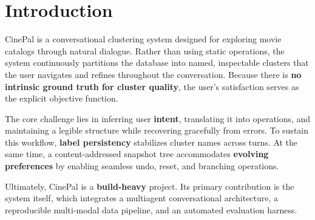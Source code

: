 \section{Introduction}\label{sec:introduction}

CinePal is a conversational clustering system designed for exploring movie catalogs through natural dialogue.
Rather than using static operations, the system continuously partitions the database into named, inspectable clusters that the user navigates and refines throughout the conversation.
Because there is \textbf{no intrinsic ground truth for cluster quality}, the user's satisfaction serves as the explicit objective function.

The core challenge lies in inferring user \textbf{intent}, translating it into operations, and maintaining a legible structure while recovering gracefully from errors.
To sustain this workflow, \textbf{label persistency} stabilizes cluster names across turns.
At the same time, a content-addressed snapshot tree accommodates \textbf{evolving preferences} by enabling seamless undo, reset, and branching operations.

Ultimately, CinePal is a \textbf{build-heavy} project.
Its primary contribution is the system itself, which integrates a multiagent conversational architecture, a reproducible multi-modal data pipeline, and an automated evaluation harness.
